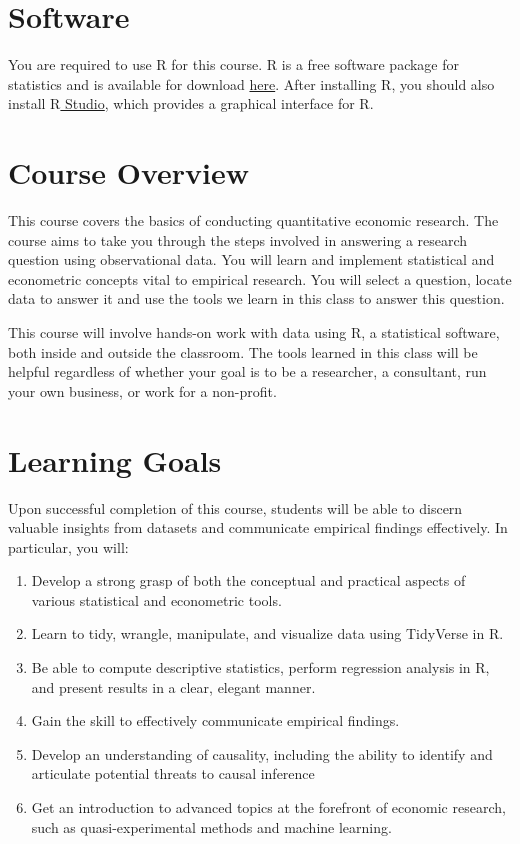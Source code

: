 \documentclass{syllabus}
\begin{document}
\section*{Software}
You are required to use $\mathrm{R}$ for this course. $\mathrm{R}$ is a free software package for statistics and is available for download \href{https://www.r-project.org}{here}. After installing $\mathrm{R}$, you should also install \href{https://posit.co/download/rstudio-desktop/}{$\mathrm{R}$ Studio}, which provides a graphical interface for $\mathrm{R}$.

\section*{Course Overview}
This course covers the basics of conducting quantitative economic research. The course aims to take you through the steps involved in answering a research question using observational data. You will learn and implement statistical and econometric concepts vital to empirical research. You will select a question, locate data to answer it and use the tools we learn in this class to answer this question.

This course will involve hands-on work with data using $\mathrm{R}$, a statistical software, both inside and outside the classroom. The tools learned in this class will be helpful regardless of whether your goal is to be a researcher, a consultant, run your own business, or work for a non-profit.

\section*{Learning Goals}
Upon successful completion of this course, students will be able to discern valuable insights from datasets and communicate empirical findings effectively. In particular, you will:
\begin{enumerate}
\itemsep0em 
  \item Develop a strong grasp of both the conceptual and practical aspects of various statistical and econometric tools.
  \item Learn to tidy, wrangle, manipulate, and visualize data using TidyVerse in $\mathrm{R}$.
  \item Be able to compute descriptive statistics, perform regression analysis in R, and present results in a clear, elegant manner.
  \item Gain the skill to effectively communicate empirical findings.
  \item Develop an understanding of causality, including the ability to identify and articulate potential threats to causal inference
  \item Get an introduction to advanced topics at the forefront of economic research, such as quasi-experimental methods and machine learning.
\end{enumerate}
\end{document}
